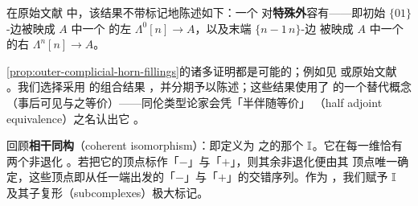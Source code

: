 在原始文献 \cite{bib61} 中，该结果不带标记地陈述如下：一个\trQuasiCategory{}%
对\textbf{特殊外\trHorn}容有\trFiller——即初始 $\{01\}$-边被映成 $A$ 中一个%
\trIsomorphism{}的左\trHorn{} $\Lambda^{0}[n]\to A$，以及末端 $\{n{-}1\,n\}$-边
被映成 $A$ 中一个\trIsomorphism{}的右\trHorn{} $\Lambda^{n}[n]\to A$。

\cref{prop:outer-complicial-horn-fillings}的诸多证明都是可能的；例如见
\cite[\S B]{bib36} 或原始文献 \cite{bib61}。我们选择采用 \trVerity{}的组合结果
\cite[\S4.2]{bib129}，并分期予以陈述；这些结果使用了\trHomotopyCoherentIsomorphism
的一个替代概念（事后可见与之等价）——同伦类型论家会凭「半伴随等价」
（half adjoint equivalence）之名认出它 \cite[\S4.2]{bib125}。

\begin{notation}[相干同构的子复形]\label{not:subcomplexes-coherent-isomorphism}
回顾\textbf{相干同构}（coherent isomorphism）：即定义为\trFreeLivingIsomorphism
之\trNerve{}的那个\trSimplicialSet{} $\mathbb{I}$。它在每一维恰有两个非退化%
\trSimplex。若把它的顶点标作「$-$」与「$+$」，则其余非退化\trSimplex{}便由其
顶点唯一确定，这些顶点即从任一端出发的「$-$」与「$+$」的交错序列。作为%
\trMarkedSimplicialSet，我们赋予 $\mathbb{I}$ 及其子复形（subcomplexes）极大标记。
\end{notation}


